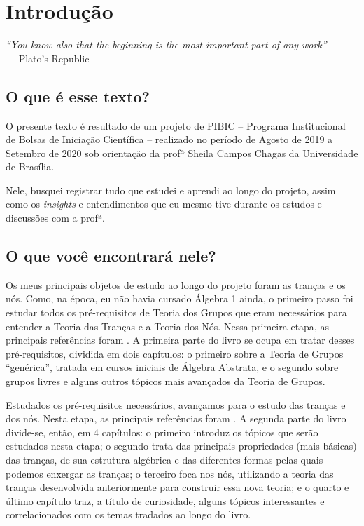 \chapter*{Introdução}
%
\hfill%
\begin{minipage}{10cm}
\begin{flushright}
\rightskip=0.5cm
\textit{``You know also that the beginning is the most important part of any work''}
\\[0.1cm]
\rightskip=0.5cm
--- Plato's Republic
\end{flushright}
\end{minipage}

\section*{O que é esse texto?}

    O presente texto é resultado de um projeto de PIBIC -- 
    Programa Institucional de Bolsas de Iniciação Científica --
    realizado no período de Agosto de 2019 a Setembro de 2020
    sob orientação da profª Sheila Campos Chagas da Universidade
    de Brasília.
    
    Nele, busquei registrar tudo que estudei e aprendi ao
    longo do projeto, assim como os {\it insights} e
    entendimentos que eu mesmo tive durante os estudos e 
    discussões com a profª.
    
\section*{O que você encontrará nele?}

    Os meus principais objetos de estudo ao longo do projeto
    foram as tranças e os nós. Como, na época, eu não havia cursado
    Álgebra 1 ainda, o primeiro passo foi estudar todos os 
    pré-requisitos de Teoria dos Grupos que eram necessários
    para entender a Teoria das Tranças e a Teoria dos Nós.
    Nessa primeira etapa, as principais referências foram
    \cite{Gallian, Livro-do-Fraleigh}. A primeira parte do
    livro se ocupa em tratar desses pré-requisitos, dividida
    em dois capítulos: o primeiro sobre a Teoria de Grupos
    ``genérica'', tratada em cursos iniciais de Álgebra Abstrata,
    e o segundo sobre grupos livres e alguns outros tópicos
    mais avançados da Teoria de Grupos.
    
    Estudados os pré-requisitos necessários, avançamos
    para o estudo das tranças e dos nós. Nesta etapa,
    as principais referências foram 
    \cite{Livro-do-Margalit, Livro-do-Kunio, knot-book}.
    A segunda parte do livro divide-se, então, em 4 capítulos:
    o primeiro introduz os tópicos que serão estudados nesta etapa;
    o segundo trata das principais propriedades (mais básicas)
    das tranças, de sua estrutura algébrica e das diferentes formas
    pelas quais podemos enxergar as tranças;
    o terceiro foca nos nós, utilizando a teoria das tranças
    desenvolvida anteriormente para construir essa nova teoria;
    e o quarto e último capítulo traz, a título de curiosidade, 
    alguns tópicos interessantes e correlacionados com os temas
    tradados ao longo do livro.
    

